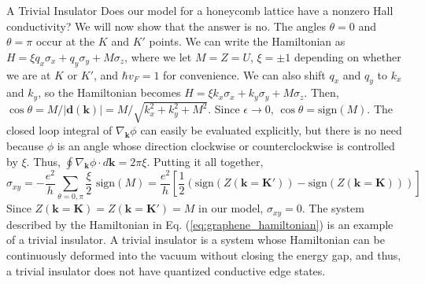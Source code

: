 \documentclass[a4paper,12pt]{article}
\renewcommand{\vec}[1]{\boldsymbol{\mathbf{#1}}}
\begin{document}
\begin{section}{A Trivial Insulator}
Does our model for a honeycomb lattice have a nonzero Hall conductivity?  We will now show that the answer is no.  The angles $\theta=0$ and $\theta=\pi$ occur at the $K$ and $K'$ points.  We can write the Hamiltonian as $H=\xi q_x \sigma_x + q_y \sigma_y + M \sigma_z$, where we let $M=Z=U$, $\xi = \pm 1$ depending on whether we are at $K$ or $K'$, and $\hbar v_F = 1$ for convenience.  We can also shift $q_x$ and $q_y$ to $k_x$ and $k_y$, so the Hamiltonian becomes $H=\xi k_x \sigma_x + k_y \sigma_y + M \sigma_z$.  
Then, $\cos{\theta}=M/|\vec{d}(\vec{k})|=M/\sqrt{k_x^2+k_y^2+M^2}$.  Since $\epsilon \rightarrow 0$, $\cos{\theta}=\text{sign}(M)$.  The closed loop integral of $\nabla_{\vec{k}} \phi$ can easily be evaluated explicitly, but there is no need because $\phi$ is an angle whose direction clockwise or counterclockwise is controlled by $\xi$. Thus, $\oint \nabla_{\vec{k}} \phi \cdot d\vec{k}=2\pi \xi$.  Putting it all together,
\begin{equation}
\sigma_{xy}=-\frac{e^2}{h} \sum_{\theta=0,\pi} \frac{\xi}{2} \text{ sign}(M) = \frac{e^2}{h} \left[ \frac{1}{2} \left( \text{sign}(Z(\vec{k}=\vec{K'})) - \text{sign}(Z(\vec{k}=\vec{K}) ) \right) \right]
\label{eq:sign_of_mass}
\end{equation}
Since $Z(\vec{k}=\vec{K})=Z(\vec{k}=\vec{K'})=M$ in our model, $\sigma_{xy}=0$.  The system described by the Hamiltonian in Eq. (\ref{eq:graphene_hamiltonian}) is an example of a trivial insulator.  A trivial insulator is a system whose Hamiltonian can be continuously deformed into the vacuum without closing the energy gap, and thus, a trivial insulator does not have quantized conductive edge states.

\end{section}
\end{document}
